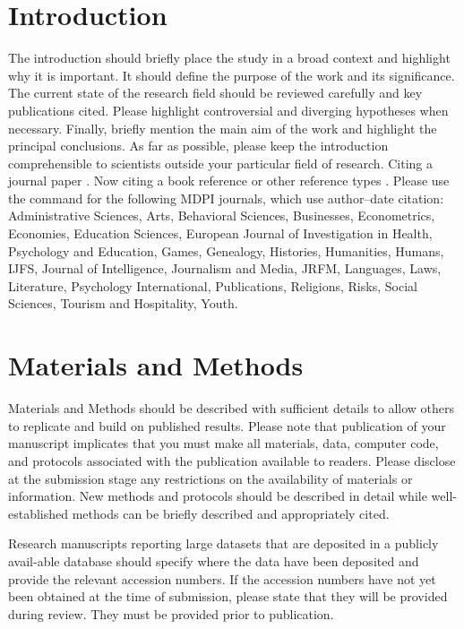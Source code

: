 \documentclass[journal,article,submit,pdftex,moreauthors]{Definitions/mdpi}
\begin{document}

\section{Introduction}

The introduction should briefly place the study in a broad context and highlight why it is important. It should define the purpose of the work and its significance. The current state of the research field should be reviewed carefully and key publications cited. Please highlight controversial and diverging hypotheses when necessary. Finally, briefly mention the main aim of the work and highlight the principal conclusions. As far as possible, please keep the introduction comprehensible to scientists outside your particular field of research. Citing a journal paper \citep{}.  Now citing a book reference \citep{ref-book1,ref-book2} or other reference types \citep{ref-unpublish,ref-url}. Please use the command \citep{ref-proceeding,ref-thesis} for the following MDPI journals, which use author--date citation: Administrative Sciences, Arts, Behavioral Sciences, Businesses, Econometrics, Economies, Education Sciences, European Journal of Investigation in Health, Psychology and Education, Games, Genealogy, Histories, Humanities, Humans, IJFS, Journal of Intelligence, Journalism and Media, JRFM, Languages, Laws, Literature, Psychology International, Publications, Religions, Risks, Social Sciences, Tourism and Hospitality, Youth. 

\section{Materials and Methods}

Materials and Methods should be described with sufficient details to allow others to replicate and build on published results. Please note that publication of your manuscript implicates that you must make all materials, data, computer code, and protocols associated with the publication available to readers. Please disclose at the submission stage any restrictions on the availability of materials or information. New methods and protocols should be described in detail while well-established methods can be briefly described and appropriately cited.

Research manuscripts reporting large datasets that are deposited in a publicly avail-able database should specify where the data have been deposited and provide the relevant accession numbers. If the accession numbers have not yet been obtained at the time of submission, please state that they will be provided during review. They must be provided prior to publication.
\end{document}
